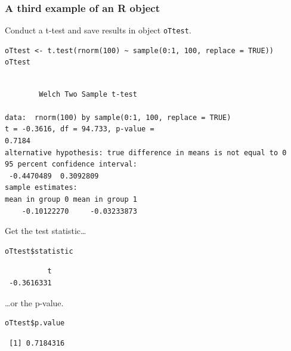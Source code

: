\documentclass[bigger]{beamer}
\begin{document}
\begin{frame}[fragile,shrink = 20]
\frametitle{A third example of an R object}
\label{sec-1-1-10}

    Conduct a t-test and save results in object \texttt{oTtest}.


\lstset{language=R}
\begin{lstlisting}
oTtest <- t.test(rnorm(100) ~ sample(0:1, 100, replace = TRUE))
oTtest
\end{lstlisting}



\begin{verbatim}

        Welch Two Sample t-test

data:  rnorm(100) by sample(0:1, 100, replace = TRUE) 
t = -0.3616, df = 94.733, p-value =
0.7184
alternative hypothesis: true difference in means is not equal to 0 
95 percent confidence interval:
 -0.4470489  0.3092809 
sample estimates:
mean in group 0 mean in group 1 
    -0.10122270     -0.03233873
\end{verbatim}


Get the test statistic\ldots


\lstset{language=R}
\begin{lstlisting}
oTtest$statistic
\end{lstlisting}

\begin{verbatim}
          t 
 -0.3616331
\end{verbatim}

\ldots or the p-value.


\lstset{language=R}
\begin{lstlisting}
oTtest$p.value
\end{lstlisting}

\begin{verbatim}
 [1] 0.7184316
\end{verbatim}
\end{frame}
\end{document}
